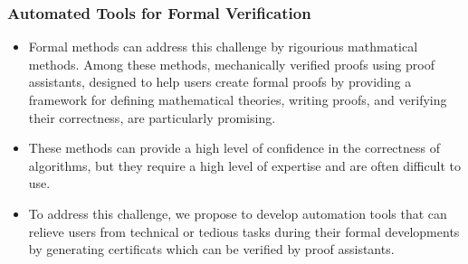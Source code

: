 \subsubsection*{Automated Tools for Formal Verification}
\begin{itemize}
    \item Formal methods can address this challenge by rigourious mathmatical methods. Among these methods, mechanically verified proofs using proof assistants, designed to help users create formal proofs by providing a framework for defining mathematical theories, writing proofs, and verifying their correctness, are particularly promising.
    \item These methods can provide a high level of confidence in the correctness of algorithms, but they require a high level of expertise and are often difficult to use.  
    \item To address this challenge, we propose to develop automation tools that can relieve users from technical or tedious tasks during their formal developments by generating certificats which can be verified by proof assistants.
\end{itemize}

